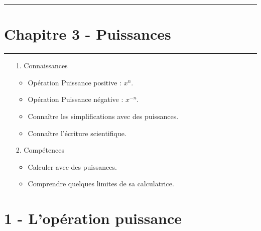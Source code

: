 \documentclass[12pt]{article}
\newcommand{\horrule}[1]{\rule{\linewidth}{#1}} %
\begin{document}

\newtheorem{Definition}{Définition}
\newtheorem{Theorem}{Théorème}
\newtheorem{Proposition}{Propriété}

\renewcommand{\labelitemi}{$\bullet$}
\renewcommand{\labelitemii}{$\circ$}

\setlength{\columnseprule}{1pt}

\horrule{2px}
\section*{Chapitre 3 - Puissances}
\horrule{2px}

\begin{enumerate}
\item[1.] Connaissances
  \begin{itemize}
  \item Opération Puissance positive : $x^n$.
  \item Opération Puissance négative : $x^{-n}$.
  \item Connaître les simplifications avec des puissances.
  \item Connaître l'écriture scientifique.
  \end{itemize}
\item[2.] Compétences
  \begin{itemize}
  \item Calculer avec des puissances.
  \item Comprendre quelques limites de sa calculatrice.
  \end{itemize}
\end{enumerate}

\section*{1 - L'opération puissance}
\end{document}
